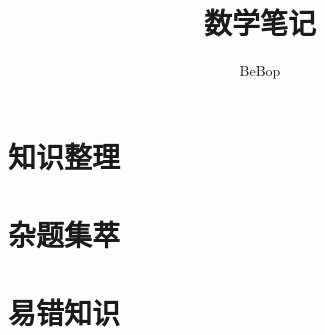 \documentclass{book}
\begin{document}
    \title{数学笔记}
    \author{BeBop}
    \maketitle
    \newpage

    \tableofcontents
    \newpage
    
    \part{知识整理}

    \part{杂题集萃}

    \part{易错知识}
\end{document}
